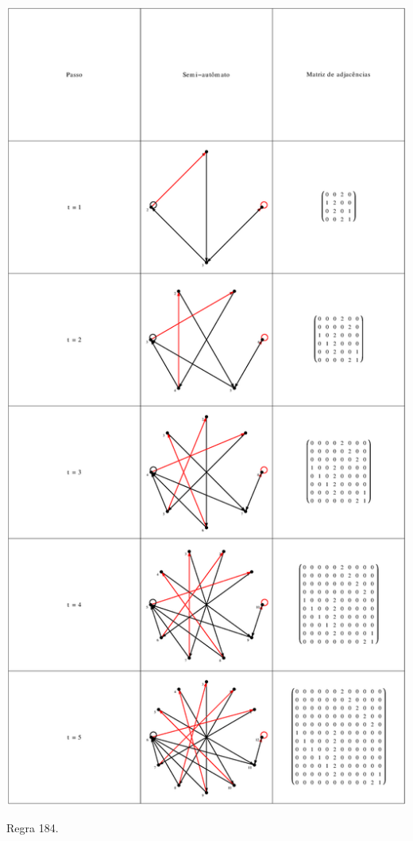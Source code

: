 \documentclass[12pt,a4paper]{article}
\begin{document}
\begin{table}[H]
\begin{center}
\includegraphics[scale=0.32]{img/mat/matr184.eps}
\caption{Regra 184.}
\label{tab:mr184}
\end{center}
\end{table}
\end{document}
